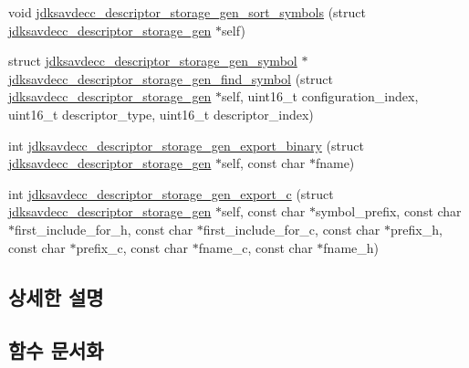 \begin{DoxyCompactItemize}
\item 
void \hyperlink{group__descriptor__storage__gen_ga3ac4e4712e9a083bbe46b48b21150fb7}{jdksavdecc\+\_\+descriptor\+\_\+storage\+\_\+gen\+\_\+sort\+\_\+symbols} (struct \hyperlink{structjdksavdecc__descriptor__storage__gen}{jdksavdecc\+\_\+descriptor\+\_\+storage\+\_\+gen} $\ast$self)
\item 
struct \hyperlink{structjdksavdecc__descriptor__storage__gen__symbol}{jdksavdecc\+\_\+descriptor\+\_\+storage\+\_\+gen\+\_\+symbol} $\ast$ \hyperlink{group__descriptor__storage__gen_ga47d4c7f5fe6e9af29eb8ad3fb7c8ea6c}{jdksavdecc\+\_\+descriptor\+\_\+storage\+\_\+gen\+\_\+find\+\_\+symbol} (struct \hyperlink{structjdksavdecc__descriptor__storage__gen}{jdksavdecc\+\_\+descriptor\+\_\+storage\+\_\+gen} $\ast$self, uint16\+\_\+t configuration\+\_\+index, uint16\+\_\+t descriptor\+\_\+type, uint16\+\_\+t descriptor\+\_\+index)
\item 
int \hyperlink{group__descriptor__storage__gen_ga5b39f9e315c20243a67642272eb77040}{jdksavdecc\+\_\+descriptor\+\_\+storage\+\_\+gen\+\_\+export\+\_\+binary} (struct \hyperlink{structjdksavdecc__descriptor__storage__gen}{jdksavdecc\+\_\+descriptor\+\_\+storage\+\_\+gen} $\ast$self, const char $\ast$fname)
\item 
int \hyperlink{group__descriptor__storage__gen_gab88ec13121f25d760e1e15d663ed6d91}{jdksavdecc\+\_\+descriptor\+\_\+storage\+\_\+gen\+\_\+export\+\_\+c} (struct \hyperlink{structjdksavdecc__descriptor__storage__gen}{jdksavdecc\+\_\+descriptor\+\_\+storage\+\_\+gen} $\ast$self, const char $\ast$symbol\+\_\+prefix, const char $\ast$first\+\_\+include\+\_\+for\+\_\+h, const char $\ast$first\+\_\+include\+\_\+for\+\_\+c, const char $\ast$prefix\+\_\+h, const char $\ast$prefix\+\_\+c, const char $\ast$fname\+\_\+c, const char $\ast$fname\+\_\+h)
\end{DoxyCompactItemize}


\subsection{상세한 설명}


\subsection{함수 문서화}
